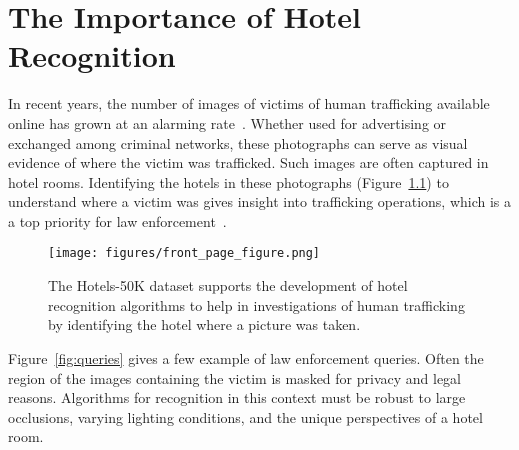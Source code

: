 
\chapter{The Importance of Hotel Recognition}
\label{ch:1}

In recent years, the number of images of victims of human trafficking available online has grown at an alarming rate~\cite{bouche2015report,ncmecAmicusBrief}. Whether used
for advertising or exchanged among criminal networks, these photographs can serve as visual evidence of where the victim was trafficked. Such images are often captured in hotel rooms. Identifying the hotels in these photographs (Figure~\ref{fig:frontPage}) to understand where a victim was gives insight into trafficking operations, which is a a top priority for law enforcement~\cite{nationalStrategy}.

\begin{figure}
    \centering
    \texttt{[image: figures/front\_page\_figure.png]}
    \caption{The Hotels-50K dataset supports the development of hotel recognition algorithms to help in investigations of human trafficking by identifying the hotel where a picture was taken.}
    \label{fig:frontPage}
\end{figure}

Figure~\ref{fig:queries} gives a few example of law enforcement queries.  Often the region of the images containing the victim is
masked for privacy and legal reasons.  Algorithms for recognition in this context must be robust to large occlusions, varying lighting conditions, and the unique perspectives of a hotel room.
